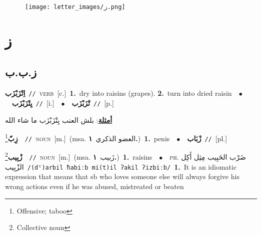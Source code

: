 \documentclass[10pt,a4paper,twoside]{article} %
\begin{document}
\begin{figure*}[t!]\centering\texttt{[image: letter\_images/ز.png]}\end{figure*}
\color{white}

 \section*{\foreignlanguage{arabic}{ز}} 
 \begin{multicols}{2} 

%
\color{black}
\vspace{-3mm}
\subsection*{\color{blue}\foreignlanguage{arabic}{ز.ب.ب}\color{blue}{}} 

{\setlength\topsep{0pt}\textbf{\foreignlanguage{arabic}{اِتْزَبْزَب}}\ {\color{gray}\texttt{//}\color{black}}\ \textsc{verb}\ [c.]\ \textbf{1.}~dry into raisins (grapes).  \textbf{2.}~turn into dried raisin\ \ $\bullet$\ \ \setlength\topsep{0pt}\textbf{\foreignlanguage{arabic}{يِتْزَبْزَب}}\ {\color{gray}\texttt{//}\color{black}}\ [i.]\ \ $\bullet$\ \ \setlength\topsep{0pt}\textbf{\foreignlanguage{arabic}{تْزَبْزَب}}\ {\color{gray}\texttt{//}\color{black}}\ [p.]\  \begin{flushright}\color{gray}\foreignlanguage{arabic}{\textbf{\underline{\foreignlanguage{arabic}{أمثلة}}}: بلش العنب يِتْزَبْزَب ما شاء الله}\end{flushright}\color{black}} \vspace{2mm}

{\setlength\topsep{0pt}\textbf{\foreignlanguage{arabic}{زِبّ}}\footnote{Offensive; taboo}\ \ {\color{gray}\texttt{//}\color{black}}\ \textsc{noun}\ [m.]\ \color{gray}(msa. \foreignlanguage{arabic}{العضو الذكري}~\foreignlanguage{arabic}{\textbf{١.}})\color{black}\ \textbf{1.}~penis\ \ $\bullet$\ \ \setlength\topsep{0pt}\textbf{\foreignlanguage{arabic}{زْبَاب}}\ {\color{gray}\texttt{//}\color{black}}\ [pl.]\ 

{\setlength\topsep{0pt}\textbf{\foreignlanguage{arabic}{زْبِيب}}\footnote{Collective noun}\ \ {\color{gray}\texttt{//}\color{black}}\ \textsc{noun}\ [m.]\ \color{gray}(msa. \foreignlanguage{arabic}{زَبيب}~\foreignlanguage{arabic}{\textbf{١.}})\color{black}\ \textbf{1.}~raisins\ \ $\bullet$\ \ \textsc{ph.} \color{gray} \foreignlanguage{arabic}{ضَرْب الحَبِيب مِثِل أَكِل الزْبِيب}\color{black}\ {\color{gray}\texttt{/{\sffamily (dˤ)arbil ħabiːb mi(t)il ʔakil ʔizbiːb}/}\color{black}}\ \textbf{1.}~It is an idiomatic expression that means that sb who loves someone else will always forgive his wrong actions even if he was abused, mistreated or beaten\ 

}}
\end{multicols}
\end{document}

